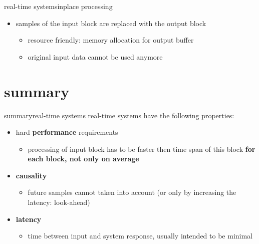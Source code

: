     \begin{frame}{real-time systems}{inplace processing}
        
        \bigskip
        
        \begin{itemize}
            \item   samples of the input block are replaced with the output block
                \begin{itemize}
                    \item<3->[$+$]  resource friendly: memory allocation for output buffer
                    \item<3->[--]  original input data cannot be used anymore
                \end{itemize}
        \end{itemize}
    \end{frame}

\section{summary}
		\begin{frame}{summary}{real-time systems}
            real-time systems have the following properties:
            \smallskip
            \begin{itemize}
                \item   hard \textbf{performance} requirements
                    \begin{itemize}
                        \item   processing of input block has to be faster then time span of this block \textbf{for each block, not only on average}
                    \end{itemize}
                \smallskip
                \item   \textbf{causality}
                    \begin{itemize}
                        \item   future samples cannot taken into account (or only by increasing the latency: look-ahead)
                    \end{itemize}
                \smallskip
                \item   \textbf{latency}
                     \begin{itemize}
                        \item   time between input and system response, usually intended to be minimal
                    \end{itemize}
           \end{itemize}
 		\end{frame}



